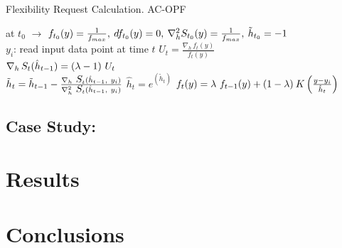 \begin{algorithm}[]
\caption{Flexibility Request Calculation. AC-OPF}
\begin{spacing}{1.7}
\begin{algorithmic}[1] \label{alg:FR_ACOPF}
\STATE at $t_{0}$ $\rightarrow$ \: $f_{t_{0}}(y) = \frac{1}{f_{max}}, \: df_{t_{0}}(y) = 0, \: \nabla^2_h \mathlarger{S}_{t_{0}}(y) = \frac{1}{f_{max}},\: \tilde{h}_{t_{0}} = -1$ \\ %
     \STATE $y_i$: read input data point at time $t$ 
     \STATE $U_t = \frac{\nabla_h \, f_t (y)}{f_t (y)}$\\ %
     \STATE $\nabla_h \, \mathlarger{S}_t (\hat{h}_{t-1}) =  (\lambda - 1) \ \mathlarger{U}_t$ \\ %
     \STATE $\tilde{h}_t = \tilde{h}_{t-1} - \frac{ \nabla_h \ \mathlarger{S}_t (\hat{h}_{t-1},\ y_i) }{\nabla^2_h \ \mathlarger{S}_t (\hat{h}_{t-1},\ y_i)}$
     \ENDIF 
     \STATE $\hat{h}_t = e^{(\tilde{h}_{t})}$ %
     \STATE  $f_{t}(y) = \lambda\ f_{t-1}(y) + (1-\lambda) \: \mathlarger{K}\left(\frac{y - y_{i}}{\hat{h}_{t}}\right)$ \\ %
\ENDFOR
\end{algorithmic} 
\end{spacing}
\end{algorithm}


\subsection{Case Study:}

\section{Results}

\section{Conclusions}


